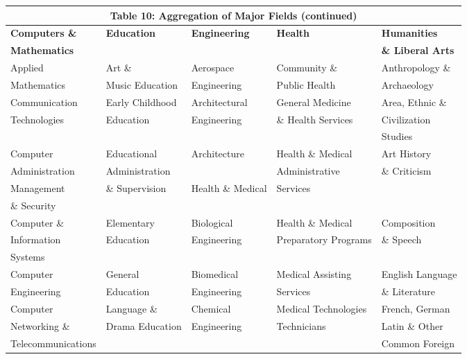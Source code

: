 \documentclass[11pt]{article}
\theoremstyle{definition}
\begin{document}
\newpage
\vspace{2.5mm}
\noindent
\begin{center}
\begingroup \scriptsize
\begin{tabular}{|l| l| l| l |l|}
\hline\hline
\multicolumn{5}{c}{\textbf{Table 10: Aggregation of Major Fields (continued)}} \\
\hline\hline 
\textbf{Computers \&} & \textbf{Education} & \textbf{Engineering} & \textbf{Health} & \textbf{Humanities}  \\
 \textbf{Mathematics} &\textbf{} & \textbf{} &\textbf{} &  \textbf{\& Liberal Arts}   \\ 
 \hline\hline \rowcolor{Gray} 
 Applied & Art \&  & Aerospace &  Community \& & Anthropology \&\\ 
 \rowcolor{Gray}
Mathematics  & Music Education & Engineering &  Public Health & Archaeology \\
 \hline
 Communication & Early Childhood & Architectural & General Medicine & Area, Ethnic \& \\
 Technologies &  Education & Engineering & \& Health Services & Civilization \\
  & & & & Studies \\
 \hline \rowcolor{Gray}
 Computer &  Educational & Architecture & Health \& Medical & Art History \\
 \rowcolor{Gray}
 Administration & Administration & & Administrative & \& Criticism \\
 \rowcolor{Gray}
Management  & \& Supervision & Health \& Medical & Services & \\ 
\rowcolor{Gray}
 \& Security& & & & \\
 \hline
 Computer \& & Elementary & Biological & Health \& Medical & Composition \\
 Information &  Education & Engineering & Preparatory Programs & \& Speech \\
 Systems & & & & \\
  \hline \rowcolor{Gray}
Computer & General & Biomedical & Medical Assisting & English Language\\
\rowcolor{Gray}
 Engineering & Education & Engineering & Services & \& Literature \\
  \hline
Computer  & Language \& & Chemical & Medical Technologies & French, German \\
Networking \&  & Drama Education & Engineering & Technicians & Latin \& Other\\
Telecommunications & & & & Common Foreign\\

\end{tabular}
\end{center}
\end{document}
